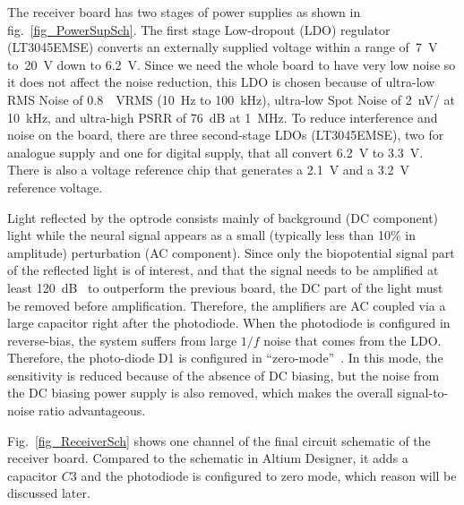 The receiver board has two stages of power supplies as shown in fig.~\ref{fig_PowerSupSch}.  The first stage Low-dropout (LDO) regulator (LT3045EMSE) converts an externally supplied voltage within a range of~\qty{7}{V} to~\qty{20}{V} down to \qty{6.2}{V}.  Since we need the whole board to have very low noise so it does not affect the noise reduction, this LDO is chosen because of ultra-low RMS Noise of \qty{0.8}{\mu VRMS} (\qty{10}{Hz} to \qty{100}{kHz}), ultra-low Spot Noise of \qty{2}{nV/\sqrthz} at \qty{10}{kHz}, and ultra-high PSRR of \qty{76}{dB} at \qty{1}{MHz}.  To reduce interference and noise on the board, there are three second-stage LDOs (LT3045EMSE), two for analogue supply and one for digital supply, that all convert \qty{6.2}{V} to \qty{3.3}{V}.  There is also a voltage reference chip that generates a \qty{2.1}{V} and a \qty{3.2}{V} reference voltage.

Light reflected by the optrode consists mainly of background (DC component) light while the neural signal appears as a small (typically less than 10\% in amplitude) perturbation (AC component). Since only the biopotential signal part of the reflected light is of interest, and that the signal needs to be amplified at least \qty{120}{dB\Omega} to outperform the previous board, the DC part of the light must be removed before amplification.  Therefore, the amplifiers are AC coupled via a large capacitor right after the photodiode. When the photodiode is configured in reverse-bias, the system suffers from large $1/f$ noise that comes from the LDO. Therefore, the photo-diode D1 is configured in ``zero-mode''~\cite{zero-mode_detection}.  In this mode, the sensitivity is reduced because of the absence of DC biasing, but the noise from the DC biasing power supply is also removed, which makes the overall signal-to-noise ratio advantageous.

Fig.~\ref{fig_ReceiverSch} shows one channel of the final circuit schematic of the receiver board.  Compared to the schematic in Altium Designer, it adds a capacitor $C3$ and the photodiode is configured to zero mode, which reason will be discussed later.

